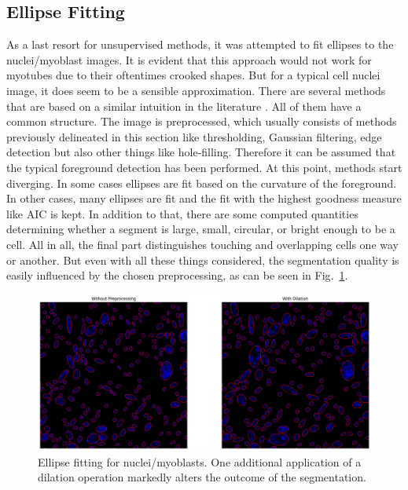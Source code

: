 \subsection{Ellipse Fitting}
As a last resort for unsupervised methods, it was attempted to fit ellipses to the nuclei/myoblast images. It is evident that this approach would not work for myotubes due to their oftentimes crooked shapes. But for a typical cell nuclei image, it does seem to be a sensible approximation. There are several methods that are based on a similar intuition in the literature \cite{panagiotakis2020region, panagiotakis2018cell, kothari2009automated}. All of them have a common structure. The image is preprocessed, which usually consists of methods previously delineated in this section like thresholding, Gaussian filtering, edge detection but also other things like hole-filling. Therefore it can be assumed that the typical foreground detection has been performed. At this point, methods start diverging. In some cases ellipses are fit based on the curvature of the foreground. In other cases, many ellipses are fit and the fit with the highest goodness measure like AIC is kept. In addition to that, there are some computed quantities determining whether a segment is large, small, circular, or bright enough to be a cell. All in all, the final part distinguishes touching and overlapping cells one way or another. But even with all these things considered, the segmentation quality is easily influenced by the chosen preprocessing, as can be seen in Fig.~\ref{figellipsefitting}. 
\begin{figure}
	\centering
	\includegraphics[width=\textwidth]{"images/ellipsefitting.png"}
	\caption[Ellipse Fitting as segmentation]{Ellipse fitting for nuclei/myoblasts. One additional application of a dilation operation markedly alters the outcome of the segmentation.}
	\label{figellipsefitting}
\end{figure}
